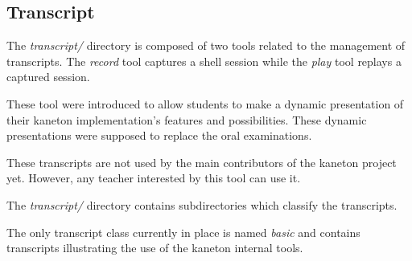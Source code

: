 %
%
%
%
%
%

%
%

\subsection{Transcript}
\label{section:transcript}

The \textit{transcript/} directory is composed of two tools related to
the management of transcripts. The \textit{record} tool captures a
shell session while the \textit{play} tool replays a captured session.

These tool were introduced to allow students to make a dynamic presentation
of their kaneton implementation's features and possibilities. These dynamic
presentations were supposed to replace the oral examinations.

These transcripts are not used by the main contributors of the kaneton
project yet. However, any teacher interested by this tool can use it.

The \textit{transcript/} directory contains subdirectories which classify
the transcripts.

The only transcript class currently in place is named \textit{basic} and
contains transcripts illustrating the use of the kaneton internal tools.
